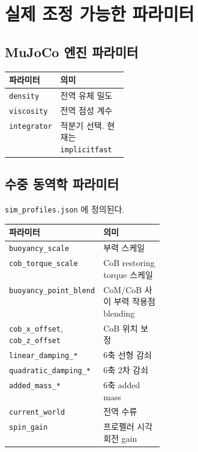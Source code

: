 \documentclass[11pt,a4paper]{article}
\newcommand{\code}[1]{\nolinkurl{#1}}
\begin{document}
\section{실제 조정 가능한 파라미터}

\subsection{MuJoCo 엔진 파라미터}

\begin{center}
\small
\begin{tabularx}{\linewidth}{>{\raggedright\arraybackslash}p{0.23\linewidth}Y}
\toprule
파라미터 & 의미 \\
\midrule
\code{density} & 전역 유체 밀도 \\
\code{viscosity} & 전역 점성 계수 \\
\code{integrator} & 적분기 선택. 현재는 \code{implicitfast} \\
\bottomrule
\end{tabularx}
\end{center}

\subsection{수중 동역학 파라미터}

\texttt{sim\_profiles.json} 에 정의된다.

\begin{center}
\small
\begin{tabularx}{\linewidth}{>{\raggedright\arraybackslash}p{0.30\linewidth}Y}
\toprule
파라미터 & 의미 \\
\midrule
\code{buoyancy_scale} & 부력 스케일 \\
\code{cob_torque_scale} & CoB restoring torque 스케일 \\
\code{buoyancy_point_blend} & CoM/CoB 사이 부력 작용점 blending \\
\code{cob_x_offset}, \code{cob_z_offset} & CoB 위치 보정 \\
\code{linear_damping_*} & 6축 선형 감쇠 \\
\code{quadratic_damping_*} & 6축 2차 감쇠 \\
\code{added_mass_*} & 6축 added mass \\
\code{current_world} & 전역 수류 \\
\code{spin_gain} & 프로펠러 시각 회전 gain \\
\bottomrule
\end{tabularx}
\end{center}
\end{document}
